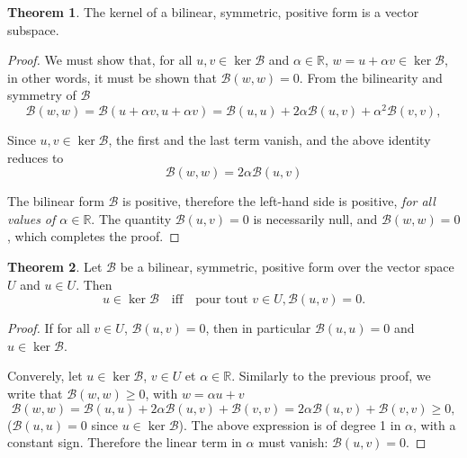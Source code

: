 \documentclass[12pt, final]{scrartcl}
\theoremstyle{definition}
\newtheorem{theorem}{Theorem}
\newcommand{\reals}{\mathbb{R}}
\begin{document}
\begin{theorem}
  The kernel of a bilinear, symmetric, positive form is a vector subspace.
\end{theorem}
\begin{proof}
  We must show that, for all $u, v \in\ker \mathcal{B}$ and $\alpha \in \reals$,
  $w = u + \alpha v \in \ker \mathcal{B}$, in other words, it must be shown that $\mathcal{B}(w, w) = 0$. From the
  bilinearity and symmetry of $\mathcal{B}$
 \begin{equation*}
   \mathcal{B}(w, w) = \mathcal{B}(u + \alpha v, u + \alpha v)
   = \mathcal{B}(u, u) + 2 \alpha \mathcal{B}(u, v) + \alpha^2 \mathcal{B}(v, v),
 \end{equation*}

 Since $u, v \in \ker\mathcal{B}$, the first and the last term vanish, and the above identity reduces to
 \begin{equation*}
   \mathcal{B}(w, w) = 2\alpha \mathcal{B}(u, v)
 \end{equation*}

 The bilinear form $\mathcal{B}$ is positive, therefore the left-hand side is positive, \emph{for all values of
   $\alpha \in \reals$}. The quantity $\mathcal{B}(u, v) = 0$ is necessarily null, and $\mathcal{B}(w, w) = 0$, which
 completes the proof.
\end{proof}

\begin{theorem}
  Let $\mathcal{B}$ be a bilinear, symmetric, positive form over the vector space $U$ and $u \in U$. Then
 \begin{equation*}
  u \in \ker\mathcal{B} \quad \text{iff} \quad \text{pour tout } v \in U, \mathcal{B}(u, v) = 0.
 \end{equation*}
\end{theorem}

\begin{proof}
  If for all $v \in U$, $\mathcal{B}(u, v) = 0$, then in particular $\mathcal{B}(u, u) = 0$ and
  $u \in \ker \mathcal{B}$.

  Converely, let $u \in \ker \mathcal{B}$, $v \in U$ et $\alpha \in \reals$. Similarly to the previous proof, we write
  that $\mathcal{B}(w, w) \geq 0$, with $w = \alpha u + v$
  \begin{equation*}
    \mathcal{B}(w, w) = \mathcal{B}(u, u) + 2 \alpha \mathcal{B}(u, v) +\mathcal{B}(v, v) = 2 \alpha \mathcal{B}(u, v) +\mathcal{B}(v, v) \geq 0,
  \end{equation*}
  ($\mathcal{B}(u, u) = 0$ since $u \in \ker \mathcal{B}$). The above expression is of degree 1 in $\alpha$, with a
  constant sign. Therefore the linear term in $\alpha$ must vanish: $\mathcal{B}(u, v) = 0$.
\end{proof}
\end{document}
